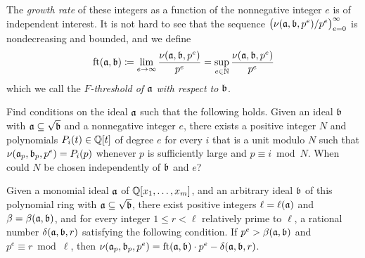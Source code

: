 \documentclass{amsart}
\begin{document}
The \emph{growth rate} of these integers as a function of the nonnegative integer $e$ is of independent interest.
It is not hard to see that the sequence $\big(\nu(\mathfrak{a},\mathfrak{b},p^e)/p^e\big)_{e=0}^{\infty}$ is nondecreasing and bounded,  and we define
\[
   \operatorname{ft}(\mathfrak{a}, \mathfrak{b}) \coloneqq \lim_{e \to \infty} \frac{\nu(\mathfrak{a}, \mathfrak{b}, p^e)}{p^e}  = \sup_{e\in \mathbb{N}} \frac{\nu(\mathfrak{a},\mathfrak{b},p^e)}{p^e}
\]
which we call the \emph{$F$-threshold of $\mathfrak{a}$ with respect to $\mathfrak{b}$}.



\begin{problem}
   Find conditions on the ideal $\mathfrak{a}$ such that the following holds.
   Given an ideal $\mathfrak{b}$ with $\mathfrak{a} \subseteq \sqrt {\mathfrak{b}}$ and a nonnegative integer $e$, there exists a positive integer $N$ and polynomials $P_i(t) \in \mathbb{Q}[t]$ of degree $e$ for every $i$ that is a unit modulo $N$ such that $\nu(\mathfrak{a}_p, \mathfrak{b}_p, p^e) = P_i(p)$ whenever $p$ is sufficiently large and $p \equiv i \bmod N$.
   When could $N$ be chosen independently of $\mathfrak{b}$ and $e$?
\end{problem}


\begin{theorem}
   \label{general-nu-theorem: T}
   Given a monomial ideal $\mathfrak{a}$ of $\mathbb{Q}[x_1, \ldots, x_m]$, and an arbitrary ideal $\mathfrak{b}$ of this polynomial ring with $\mathfrak{a} \subseteq \sqrt{\mathfrak{b}}$, there exist positive integers $\ell = \ell(\mathfrak{a})$ and  $\beta = \beta(\mathfrak{a}, \mathfrak{b})$, and for every integer $1 \leq r < \ell$ relatively prime to $\ell$, a rational number $\delta(\mathfrak{a}, \mathfrak{b}, r)$ satisfying the following condition.
   If $p^e > \beta(\mathfrak{a}, \mathfrak{b})$ and $p^e \equiv r \bmod \ell$, then $ \nu(\mathfrak{a}_p, \mathfrak{b}_p, p^e) = \operatorname{ft}(\mathfrak{a}, \mathfrak{b}) \cdot p^e - \delta(\mathfrak{a}, \mathfrak{b}, r)$.
\end{theorem}
\end{document}
